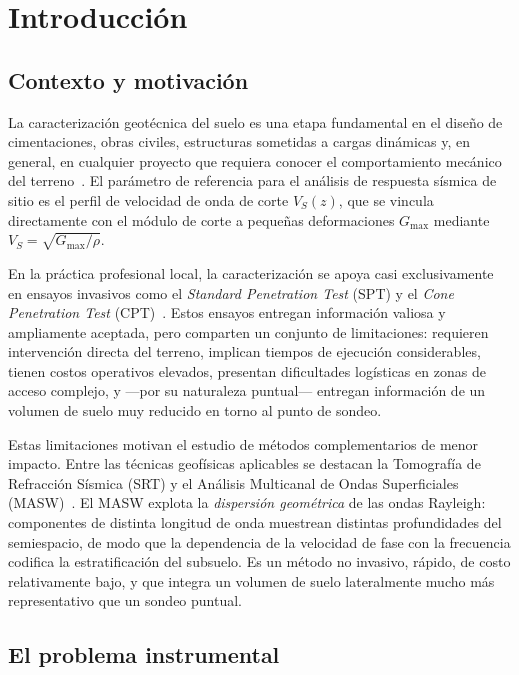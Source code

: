\section{Introducci\'on}

\subsection{Contexto y motivaci\'on}

La caracterizaci\'on geot\'ecnica del suelo es una etapa fundamental en el dise\~no de
cimentaciones, obras civiles, estructuras sometidas a cargas din\'amicas y, en general,
en cualquier proyecto que requiera conocer el comportamiento mec\'anico del
terreno~\cite{Kramer1996,Mitchell2005}. El par\'ametro de referencia para el an\'alisis de
respuesta s\'ismica de sitio es el perfil de velocidad de onda de corte $V_S(z)$, que se
vincula directamente con el m\'odulo de corte a peque\~nas deformaciones $G_{\max}$
mediante $V_S=\sqrt{G_{\max}/\rho}$.

En la pr\'actica profesional local, la caracterizaci\'on se apoya casi exclusivamente en
ensayos invasivos como el \emph{Standard Penetration Test} (SPT) y el \emph{Cone
Penetration Test} (CPT)~\cite{ASTM}. Estos ensayos entregan informaci\'on valiosa y
ampliamente aceptada, pero comparten un conjunto de limitaciones: requieren
intervenci\'on directa del terreno, implican tiempos de ejecuci\'on considerables, tienen
costos operativos elevados, presentan dificultades log\'isticas en zonas de acceso
complejo, y ---por su naturaleza puntual--- entregan informaci\'on de un volumen de
suelo muy reducido en torno al punto de sondeo.

Estas limitaciones motivan el estudio de m\'etodos complementarios de menor impacto.
Entre las t\'ecnicas geof\'isicas aplicables se destacan la Tomograf\'ia de Refracci\'on
S\'ismica (SRT) y el An\'alisis Multicanal de Ondas Superficiales
(MASW)~\cite{Park1999,Xia1999,Foti2014}. El MASW explota la \emph{dispersi\'on
geom\'etrica} de las ondas Rayleigh: componentes de distinta longitud de onda muestrean
distintas profundidades del semiespacio, de modo que la dependencia de la velocidad de
fase con la frecuencia codifica la estratificaci\'on del subsuelo. Es un m\'etodo no
invasivo, r\'apido, de costo relativamente bajo, y que integra un volumen de suelo
lateralmente mucho m\'as representativo que un sondeo puntual.

\subsection{El problema instrumental}

